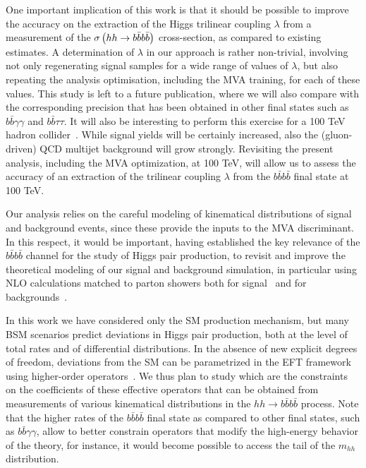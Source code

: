 One important implication of this work is that it should
be possible to improve  the accuracy on the extraction of
the Higgs trilinear coupling $\lambda$ from
a measurement of the
$\sigma\left( hh\to b\bar{b}b\bar{b}\right)$ cross-section, as compared
to existing estimates.
%
A determination of $\lambda$ in our approach is rather
non-trivial, involving
 not only regenerating signal samples
 for a wide range of values of  $\lambda$, but also
 repeating the analysis
optimisation, including the MVA training, for each
of these values.
%
This study is left to a future
publication, where we will also
compare with the corresponding  precision 
that has been obtained in other final states such as
 $b\bar{b}\gamma\gamma$
and $b\bar{b}\tau\tau$.
%
It will also be  interesting to perform
this exercise for a 100 TeV hadron collider~\cite{Barr:2014sga,
  Azatov:2015oxa,Papaefstathiou:2015iba,
  Arkani-Hamed:2015vfh}.
%
While signal yields will be certainly increased, also the (gluon-driven) QCD
multijet background will grow strongly.
%
Revisiting
the present analysis, including the MVA optimization,
at 100 TeV, will allow us
to assess the accuracy of an extraction of the trilinear
coupling $\lambda$ from the $b\bar{b}b\bar{b}$ final state
at 100 TeV.


Our analysis relies on the careful modeling of kinematical
distributions of signal and background events, since these provide
the inputs to the MVA discriminant.
%
In this respect, it would be important, having established the key
relevance of the $b\bar{b}b\bar{b}$ channel for the study of
Higgs pair production, to revisit and improve the
theoretical modeling of our signal and background simulation,
in particular using NLO calculations matched to
parton showers both for signal~\cite{Frederix:2014hta,Maierhofer:2013sha}
and for backgrounds~\cite{Alwall:2014hca,Gleisberg:2008ta}.
%

In this work we have considered only the SM production mechanism,
but many BSM scenarios predict deviations
in Higgs pair production, both at the level of total rates
and of
differential distributions.
%
In the absence of new explicit degrees of freedom,
deviations from the SM can be parametrized in
the EFT framework using higher-order
operators~\cite{Azatov:2015oxa,Goertz:2014qta}.
%
We thus plan to study which are the constraints
on the coefficients of these effective
operators that can be obtained from measurements
of various kinematical distributions
in the $hh\to b\bar{b}b\bar{b}$ process.
%
Note that the higher rates of the $b\bar{b}b\bar{b}$ final state as compared to
other final states, such as
$b\bar{b}\gamma\gamma$, allow to better constrain operators
that modify the high-energy behavior
of the theory, for instance,
it would become possible
to access the tail of the $m_{hh}$ distribution.


